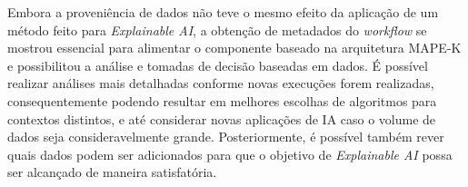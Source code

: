 \documentclass[posterIC]{a0poster}
\begin{document}
\begin{multicols}{2}
Embora a proveniência de dados não teve o mesmo efeito da aplicação de um método feito para \textit{Explainable AI}, a obtenção de metadados do \textit{workflow} se mostrou essencial para alimentar o componente baseado na arquitetura MAPE-K e possibilitou a análise e tomadas de decisão baseadas em dados. É possível realizar análises mais detalhadas conforme novas execuções forem realizadas, consequentemente podendo resultar em melhores escolhas de algoritmos para contextos distintos, e até considerar novas aplicações de IA caso o volume de dados seja consideravelmente grande. Posteriormente, é possível também rever quais dados podem ser adicionados para que o objetivo de \textit{Explainable AI} possa ser alcançado de maneira satisfatória.



\end{multicols}






\makefooter
\end{document}
